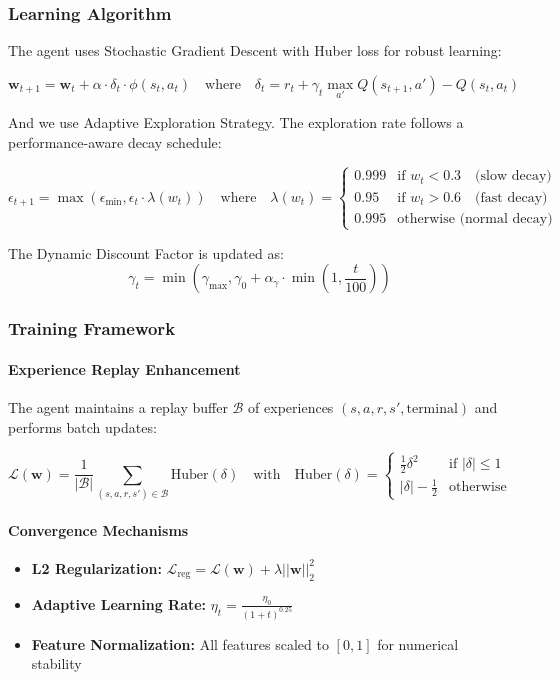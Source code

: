 \documentclass{article}
\begin{document}
\subsubsection{Learning Algorithm}

The agent uses Stochastic Gradient Descent with Huber loss for robust learning:

\[
\mathbf{w}_{t+1} = \mathbf{w}_t + \alpha \cdot \delta_t \cdot \phi(s_t, a_t)
\quad \text{where} \quad
\delta_t = r_t + \gamma_t \max_{a'} Q(s_{t+1}, a') - Q(s_t, a_t)
\]


And we use Adaptive Exploration Strategy. The exploration rate follows a performance-aware decay schedule:

\[
\epsilon_{t+1} = \max(\epsilon_{\min}, \epsilon_t \cdot \lambda(w_t))
\quad \text{where} \quad
\lambda(w_t) = \begin{cases}
0.999 & \text{if } w_t < 0.3 \quad \text{(slow decay)} \\
0.95 & \text{if } w_t > 0.6 \quad \text{(fast decay)} \\
0.995 & \text{otherwise (normal decay)}
\end{cases}
\]

The Dynamic Discount Factor is updated as: 
\[
\gamma_t = \min(\gamma_{\max}, \gamma_0 + \alpha_\gamma \cdot \min(1, \frac{t}{100}))
\]


\subsubsection{Training Framework}

\paragraph{Experience Replay Enhancement}
The agent maintains a replay buffer $\mathcal{B}$ of experiences $(s, a, r, s', \text{terminal})$ and performs batch updates:

\[
\mathcal{L}(\mathbf{w}) = \frac{1}{|\mathcal{B}|} \sum_{(s,a,r,s') \in \mathcal{B}} \text{Huber}(\delta)
\quad \text{with} \quad
\text{Huber}(\delta) = \begin{cases}
\frac{1}{2} \delta^2 & \text{if } |\delta| \leq 1 \\
|\delta| - \frac{1}{2} & \text{otherwise}
\end{cases}
\]

\paragraph{Convergence Mechanisms}
\begin{itemize}
    \item \textbf{L2 Regularization:} $\mathcal{L}_{\text{reg}} = \mathcal{L}(\mathbf{w}) + \lambda ||\mathbf{w}||_2^2$
    \item \textbf{Adaptive Learning Rate:} $\eta_t = \frac{\eta_0}{(1 + t)^{0.25}}$
    \item \textbf{Feature Normalization:} All features scaled to $[0,1]$ for numerical stability
\end{itemize}
\end{document}

